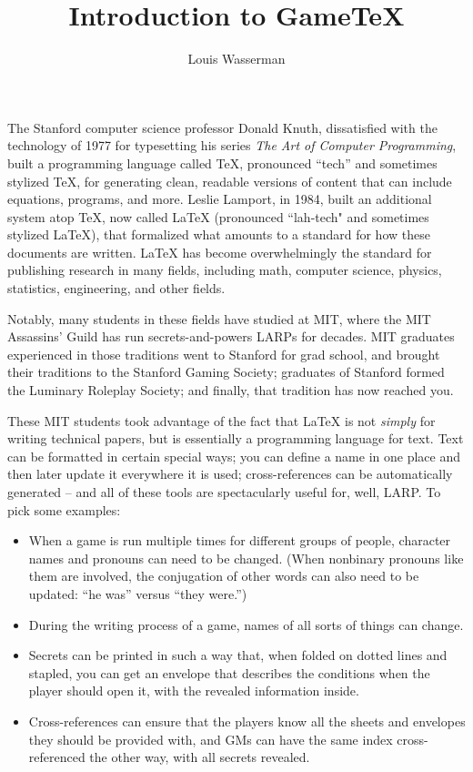 \documentclass{article}
\title{Introduction to Game\TeX{}}
\author{Louis Wasserman}
\begin{document}
\maketitle{}

The Stanford computer science professor Donald Knuth, dissatisfied with the technology of 1977 for typesetting his series \textit{The Art of Computer Programming}, built a programming language called TeX,
pronounced ``tech'' and sometimes stylized \TeX{}, for generating clean, readable versions of content that can include equations, programs, and more. 
Leslie Lamport, in 1984, built an additional system atop \TeX{}, now called LaTeX (pronounced ``lah-tech" and sometimes stylized \LaTeX{}), that formalized what amounts to a standard for how these documents are written.  LaTeX has become overwhelmingly the standard for publishing research in many fields, including math, computer science, physics, statistics, engineering, and other fields.

Notably, many students in these fields have studied at MIT, where the MIT Assassins' Guild has run secrets-and-powers LARPs for decades.  MIT graduates experienced in those traditions went to Stanford for grad school, and brought their traditions to the Stanford Gaming Society; graduates of Stanford formed the Luminary Roleplay Society; and finally, that tradition has now reached you.

These MIT students took advantage of the fact that LaTeX is not \textit{simply} for writing technical papers, but is essentially a programming language for text.  Text can be formatted in certain special ways; you can define a name in one place and then later update it everywhere it is used; cross-references can be automatically generated -- and all of these tools are spectacularly useful for, well, LARP.  To pick some examples:
\begin{itemize}
    \item When a game is run multiple times for different groups of people, character names and pronouns can need to be changed.  (When nonbinary pronouns like them are involved, the conjugation of other words can also need to be updated: ``he was'' versus ``they were.'')
    \item During the writing process of a game, names of all sorts of things can change.
    \item Secrets can be printed in such a way that, when folded on dotted lines and stapled, you can get an envelope that describes the conditions when the player should open it, with the revealed information inside.
    \item Cross-references can ensure that the players know all the sheets and envelopes they should be provided with, and GMs can have the same index cross-referenced the other way, with all secrets revealed.
\end{itemize}
\end{document}
